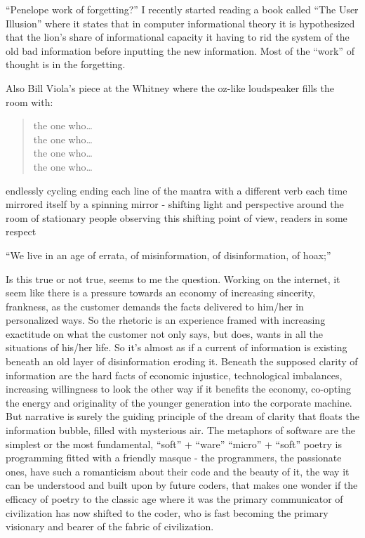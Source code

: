 \documentclass[
]{memoir}
\begin{document}
``Penelope work of forgetting?'' I recently started reading a book
called ``The User Illusion'' where it states that in computer
informational theory it is hypothesized that the lion's share of
informational capacity it having to rid the system of the old bad
information before inputting the new information. Most of the ``work''
of thought is in the forgetting.

Also Bill Viola's piece at the Whitney where the oz-like loudspeaker
fills the room with:

\begin{verse}
the one who…\\
the one who…\\
the one who…\\
the one who…\\
\end{verse}

endlessly cycling ending each line of the mantra with a different verb
each time mirrored itself by a spinning mirror - shifting light and
perspective around the room of stationary people observing this shifting
point of view, readers in some respect

``We live in an age of errata, of misinformation, of disinformation, of
hoax;''

Is this true or not true, seems to me the question. Working on the
internet, it seem like there is a pressure towards an economy of
increasing sincerity, frankness, as the customer demands the facts
delivered to him/her in personalized ways. So the rhetoric is an
experience framed with increasing exactitude on what the customer not
only says, but does, wants in all the situations of his/her life. So
it's almost as if a current of information is existing beneath an old
layer of disinformation eroding it. Beneath the supposed clarity of
information are the hard facts of economic injustice, technological
imbalances, increasing willingness to look the other way if it benefits
the economy, co-opting the energy and originality of the younger
generation into the corporate machine. But narrative is surely the
guiding principle of the dream of clarity that floats the information
bubble, filled with mysterious air. The metaphors of software are the
simplest or the most fundamental, ``soft'' + ``ware'' ``micro'' +
``soft'' poetry is programming fitted with a friendly masque - the
programmers, the passionate ones, have such a romanticism about their
code and the beauty of it, the way it can be understood and built upon
by future coders, that makes one wonder if the efficacy of poetry to the
classic age where it was the primary communicator of civilization has
now shifted to the coder, who is fast becoming the primary visionary and
bearer of the fabric of civilization.
\end{document}
